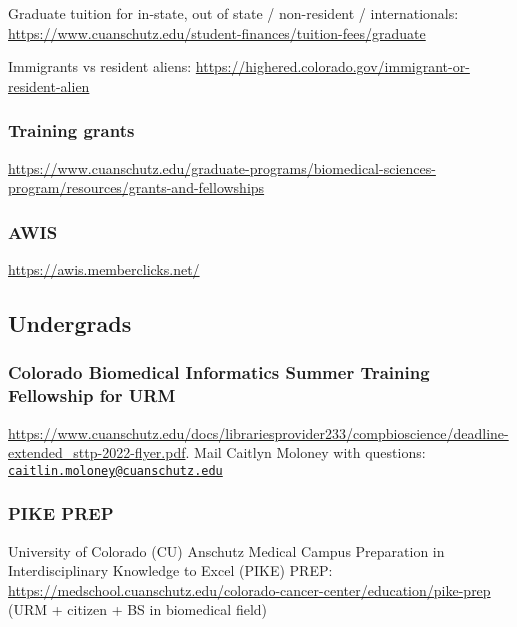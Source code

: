 \documentclass[
  letterpaper,
  DIV=11,
  numbers=noendperiod]{scrreprt}
\begin{document}
Graduate tuition for in-state, out of state / non-resident /
internationals:
\url{https://www.cuanschutz.edu/student-finances/tuition-fees/graduate}

Immigrants vs resident aliens:
\url{https://highered.colorado.gov/immigrant-or-resident-alien}

\hypertarget{training-grants}{%
\subsubsection{Training grants}\label{training-grants}}

\url{https://www.cuanschutz.edu/graduate-programs/biomedical-sciences-program/resources/grants-and-fellowships}

\hypertarget{awis}{%
\subsubsection{AWIS}\label{awis}}

\url{https://awis.memberclicks.net/}

\hypertarget{undergrads}{%
\subsection{Undergrads}\label{undergrads}}

\hypertarget{colorado-biomedical-informatics-summer-training-fellowship-for-urm}{%
\subsubsection{Colorado Biomedical Informatics Summer Training
Fellowship for
URM}\label{colorado-biomedical-informatics-summer-training-fellowship-for-urm}}

\url{https://www.cuanschutz.edu/docs/librariesprovider233/compbioscience/deadline-extended_sttp-2022-flyer.pdf}.
Mail Caitlyn Moloney with questions:
\href{mailto:caitlin.moloney@cuanschutz.edu}{\nolinkurl{caitlin.moloney@cuanschutz.edu}}

\hypertarget{pike-prep}{%
\subsubsection{PIKE PREP}\label{pike-prep}}

University of Colorado (CU) Anschutz Medical Campus Preparation in
Interdisciplinary Knowledge to Excel (PIKE) PREP:
\url{https://medschool.cuanschutz.edu/colorado-cancer-center/education/pike-prep}
(URM + citizen + BS in biomedical field)
\end{document}

